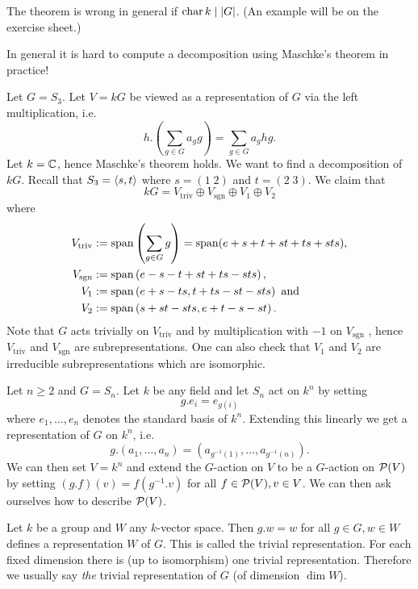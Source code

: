 \begin{warn}
 The theorem is wrong in general if $\operatorname{char} k \mid |G|$. (An example will be on the exercise sheet.)
\end{warn}

\begin{expl}
 In general it is hard to compute a decomposition using Maschke’s theorem in practice!
 
 Let $G = S_3$. Let $V = kG$ be viewed as a representation of $G$ via the left multiplication, i.e.
 \[
  h.\left(\sum_{g \in G} a_g g\right) = \sum_{g \in G} a_g hg.
 \]
 Let $k = \mathbb{C}$, hence Maschke’s theorem holds. We want to find a decomposition of $kG$. Recall that $S_3 = \left\langle s,t \right\rangle$ where $s = (1 \; 2)$ and $t = (2 \; 3)$. We claim that
 \[
  kG = V_{\text{triv}} \oplus V_{\text{sgn}} \oplus V_1 \oplus V_2
 \]
 where
 \begin{align*}
  V_{\text{triv}} &:= \operatorname{span}\left(\sum_{g \in G} g \right) = \operatorname{span}(e+s+t+st+ts+sts), \\
  V_{\text{sgn}} &:= \operatorname{span}\left(e-s-t+st+ts-sts\right), \\
  V_1 &:= \operatorname{span}\left(e+s-ts, t+ts-st-sts\right) \text{ and} \\
  V_2 &:= \operatorname{span}\left(s+st-sts,e+t-s-st\right).
 \end{align*}
 Note that $G$ acts trivially on $V_{\text{triv}}$ and by multiplication with $-1$ on $V_{\text{sgn}}$ , hence $V_{\text{triv}}$ and $V_{\text{sgn}}$ are subrepresentations. One can also check that $V_1$ and $V_2$ are irreducible subrepresentations which are isomorphic.
\end{expl}


\begin{expl}
 Let $n \geq 2$ and $G = S_n$. Let $k$ be any field and let $S_n$ act on $k^n$ by setting
 \[
  g.e_i = e_{g(i)}
 \]
 where $e_1, \ldots, e_n$ denotes the standard basis of $k^n$. Extending this linearly we get a representation of $G$ on $k^n$, i.e.
 \[
  g.(a_1, \ldots, a_n) = \left(a_{g^{-1}(1)}, \ldots, a_{g^{-1}(n)}\right).
 \]
 We can then set $V = k^n$ and extend the $G$-action on $V$ to be a $G$-action on $\mathcal{P}(V)$ by setting $(g.f)(v) = f(g^{-1}.v)$ for all $f \in \mathcal{P}(V), v \in V$. We can then ask ourselves how to describe $\mathcal{P}(V)$.
\end{expl}


\begin{defi}
 Let $k$ be a group and $W$ any $k$-vector space. Then $g.w = w$ for all $g \in G, w \in W$ defines a representation $W$ of $G$. This is called the trivial representation. For each fixed dimension there is (up to isomorphism) one trivial representation. Therefore we usually say \emph{the} trivial representation of $G$ (of dimension $\dim W$).
\end{defi}


